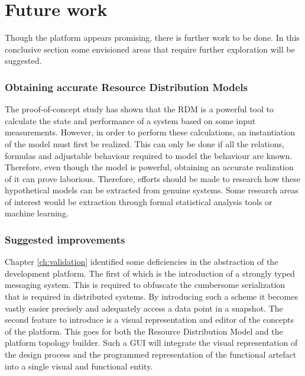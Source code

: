 \section{Future work}
Though the platform appears promising, there is further work to be done. In this conclusive section some envisioned areas that require further exploration will be suggested.

\subsubsection{Obtaining accurate Resource Distribution Models}
The proof-of-concept study has shown that the RDM is a powerful tool to calculate the state and performance of a system based on some input measurements. However, in order to perform these calculations, an instantiation of the model must first be realized. This can only be done if all the relations, formulas and adjustable behaviour required to model the behaviour are known. Therefore, even though the model is powerful, obtaining an accurate realization of it can prove laborious. Therefore, efforts should be made to research how these hypothetical models can be extracted from genuine systems. Some research areas of interest would be extraction through formal statistical analysis tools or machine learning.

\subsubsection{Suggested improvements}
Chapter \ref{ch:validation} identified some deficiencies in the abstraction of the development platform. The first of which is the introduction of a strongly typed messaging system. This is required to obfuscate the cumbersome serialization that is required in distributed systems. By introducing such a scheme it becomes vastly easier precisely and adequately access a data point in a snapshot.
The second feature to introduce is a visual representation and editor of the concepts of the platform. This goes for both the Resource Distribution Model and the platform topology builder. Such a GUI will integrate the visual representation of the design process and the programmed representation of the functional artefact into a single visual and functional entity.

